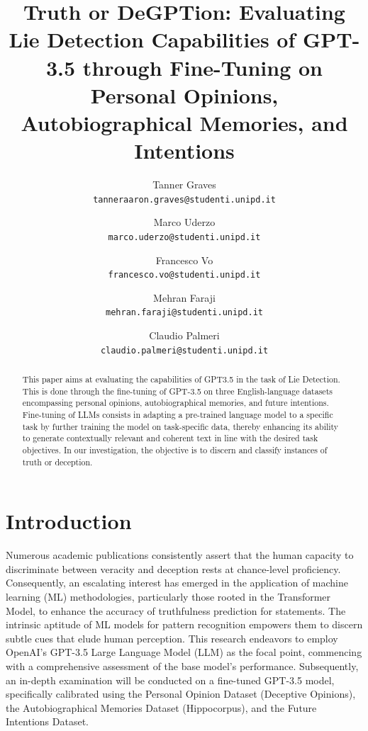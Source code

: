 \documentclass[10pt,twocolumn,letterpaper]{article}
\begin{document}
\title{Truth or DeGPTion: Evaluating Lie Detection Capabilities of GPT-3.5 through Fine-Tuning on Personal Opinions, Autobiographical Memories, and Intentions}


\author{
Tanner Graves\\
{\tt\small tanneraaron.graves@studenti.unipd.it}
\and
Marco Uderzo\\
{\tt\small marco.uderzo@studenti.unipd.it}
\and
Francesco Vo \\
{\tt\small francesco.vo@studenti.unipd.it}
\and
Mehran Faraji\\
{\tt\small mehran.faraji@studenti.unipd.it}
\and
Claudio Palmeri \\
{\tt\small claudio.palmeri@studenti.unipd.it}
}

\maketitle


\begin{abstract}
This paper aims at evaluating the capabilities of GPT3.5 in the task of Lie Detection.
This is done through the fine-tuning of GPT-3.5 on three English-language datasets encompassing 
personal opinions, autobiographical memories, and future intentions. 
Fine-tuning of LLMs consists in adapting a pre-trained language model to a specific 
task by further training the model on task-specific data, thereby 
enhancing its ability to generate contextually relevant and coherent text in 
line with the desired task objectives. In our investigation, the objective is to 
discern and classify instances of truth or deception.

\end{abstract}

\section{Introduction}
Numerous academic publications consistently assert that the human capacity to discriminate 
between veracity and deception rests at chance-level proficiency. Consequently, an escalating 
interest has emerged in the application of machine learning (ML) methodologies, particularly 
those rooted in the Transformer Model, to enhance the accuracy of truthfulness prediction for statements. 
The intrinsic aptitude of ML models for pattern recognition empowers them to discern subtle cues 
that elude human perception. This research endeavors to employ OpenAI's GPT-3.5 Large Language Model (LLM) 
as the focal point, commencing with a comprehensive assessment of the base model's performance. Subsequently, 
an in-depth examination will be conducted on a fine-tuned GPT-3.5 model, specifically calibrated using the 
Personal Opinion Dataset (Deceptive Opinions), the Autobiographical Memories Dataset (Hippocorpus), and the 
Future Intentions Dataset. \\
\end{document}
